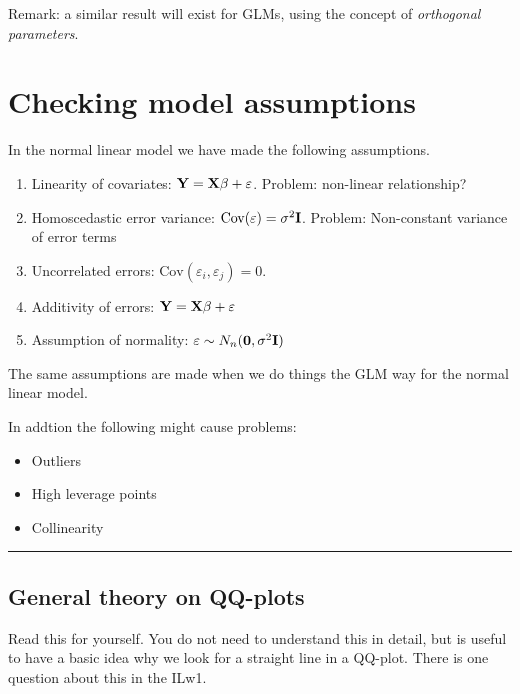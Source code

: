 \documentclass[
]{article}
\providecommand{\tightlist}{%
  \setlength{\itemsep}{0pt}\setlength{\parskip}{0pt}}
\begin{document}
Remark: a similar result will exist for GLMs, using the concept of
\emph{orthogonal parameters}.

\hypertarget{checking-model-assumptions}{%
\section{Checking model assumptions}\label{checking-model-assumptions}}

In the normal linear model we have made the following assumptions.

\begin{enumerate}
\def\labelenumi{\arabic{enumi}.}
\item
  Linearity of covariates: \({\bf Y}={\bf X}\beta+\varepsilon\).
  Problem: non-linear relationship?
\item
  Homoscedastic error variance:
  \(\text{Cov}(\varepsilon)=\sigma^2 {\bf I}\). Problem: Non-constant
  variance of error terms
\item
  Uncorrelated errors: \(\text{Cov}(\varepsilon_i,\varepsilon_j)=0\).
\item
  Additivity of errors: \({\bf Y}={\bf X}\beta+\varepsilon\)
\item
  Assumption of normality:
  \(\varepsilon \sim N_n({\bf 0},\sigma^2{\bf I})\)
\end{enumerate}

The same assumptions are made when we do things the GLM way for the
normal linear model.

In addtion the following might cause problems:

\begin{itemize}
\tightlist
\item
  Outliers
\item
  High leverage points
\item
  Collinearity
\end{itemize}

\begin{center}\rule{0.5\linewidth}{0.5pt}\end{center}

\hypertarget{general-theory-on-qq-plots}{%
\subsection{General theory on
QQ-plots}\label{general-theory-on-qq-plots}}

Read this for yourself. You do not need to understand this in detail,
but is useful to have a basic idea why we look for a straight line in a
QQ-plot. There is one question about this in the ILw1.
\end{document}

